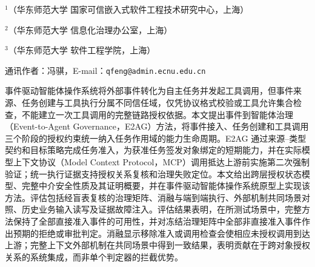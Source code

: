 \thispagestyle{josfirst}


\vspace{7pt}

\vspace{4pt}
\begingroup\fontsize{8pt}{12pt}\selectfont
\noindent$^{1}$（华东师范大学 国家可信嵌入式软件工程技术研究中心，上海）\par
\noindent$^{2}$（华东师范大学 信息化治理办公室，上海）\par
\noindent$^{3}$（华东师范大学 软件工程学院，上海）\par
\noindent 通讯作者：冯骐，E-mail：\texttt{qfeng@admin.ecnu.edu.cn}\par
\endgroup

\begin{joszhabstract}
事件驱动智能体操作系统将外部事件转化为自主任务并发起工具调用，但事件来源、任务创建与工具执行分属不同信任域，仅凭协议格式校验或工具允许集合检查，不能建立一次工具调用的完整链路授权依据。本文提出事件到智能体治理（Event-to-Agent Governance，E2AG）方法，将事件接入、任务创建和工具调用三个阶段的授权约束统一纳入任务作用域的能力生命周期。E2AG 通过来源--类型契约和目标策略完成任务准入，为获准任务签发对象绑定的短期能力，并在实际模型上下文协议（Model Context Protocol，MCP）调用抵达上游前实施第二次强制验证；统一执行证据支持授权关系复核和治理失败定位。本文给出跨层授权状态模型、完整中介安全性质及其证明概要，并在事件驱动智能体操作系统原型上实现该方法。评估包括经盲表复核的治理矩阵、消融与端到端执行、外部机制共同场景对照、历史业务输入读写及证据故障注入。评估结果表明，在所测试场景中，完整方法保持了全部直接准入事件的可用性，并对冻结治理矩阵中全部非直接准入事件作出预期的拒绝或审批判定。消融显示移除准入或调用检查会使相应未授权调用到达上游；完整上下文外部机制在共同场景中得到一致结果，表明贡献在于跨对象授权关系的系统集成，而非单个判定器的拦截优势。
\end{joszhabstract}

